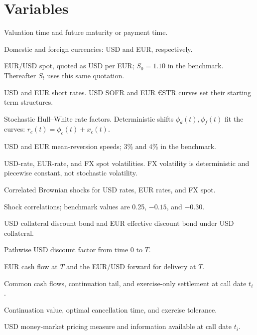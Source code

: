 {\section{Variables}
\begin{description}[style=nextline]
  \item[$t,T$] Valuation time and future maturity or payment time.
  \item[$d,f$] Domestic and foreign currencies: USD and EUR, respectively.
  \item[$S_t^{\mathrm{USD/EUR}}$] EUR/USD spot, quoted as USD per EUR; $S_0=1.10$ in the benchmark. Thereafter $S_t$ uses this same quotation.
  \item[$r_d(t),r_f(t)$] USD and EUR short rates. USD SOFR and EUR €STR curves set their starting term structures.
  \item[$x_d(t),x_f(t)$] Stochastic Hull--White rate factors. Deterministic shifts $\phi_d(t),\phi_f(t)$ fit the curves: $r_c(t)=\phi_c(t)+x_c(t)$.
  \item[$a_d,a_f$] USD and EUR mean-reversion speeds; 3\% and 4\% in the benchmark.
  \item[$\sigma_d(t),\sigma_f(t),\sigma_S(t)$] USD-rate, EUR-rate, and FX spot volatilities. FX volatility is deterministic and piecewise constant, not stochastic volatility.
  \item[$W_d,W_f,W_S$] Correlated Brownian shocks for USD rates, EUR rates, and FX spot.
  \item[$\rho_{df},\rho_{dS},\rho_{fS}$] Shock correlations; benchmark values are 0.25, $-0.15$, and $-0.30$.
  \item[$P_d(t,T),P_f^*(t,T)$] USD collateral discount bond and EUR effective discount bond under USD collateral.
  \item[$D_d(0,T)$] Pathwise USD discount factor from time 0 to $T$.
  \item[$CF_f(T),F_{FX}(0,T)$] EUR cash flow at $T$ and the EUR/USD forward for delivery at $T$.
  \item[$A_i,Y_i,J_i$] Common cash flows, continuation tail, and exercise-only settlement at call date $t_i$.
  \item[$C_i,\tau^*,\varepsilon_{\mathrm{ex}}$] Continuation value, optimal cancellation time, and exercise tolerance.
  \item[$\mathbb{Q}^d,\mathcal{F}_{t_i}$] USD money-market pricing measure and information available at call date $t_i$.
\end{description}

}
